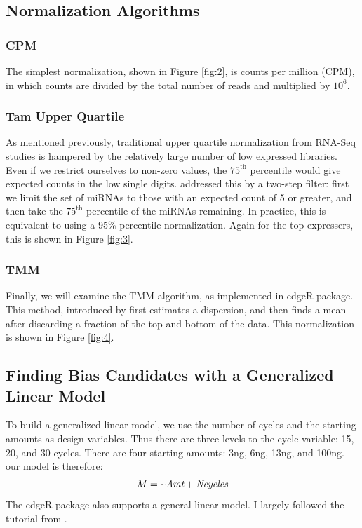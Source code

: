 \documentclass{bioinfo}
\begin{document}
\begin{methods}
\subsection{Normalization Algorithms}
\subsubsection{CPM}
The simplest normalization, shown in Figure \ref{fig:2}, is counts per million (CPM), in which counts are divided by the total number of reads and multiplied by $10^6$. \\

\subsubsection{Tam Upper Quartile}
As mentioned previously, traditional upper quartile normalization from RNA-Seq studies is hampered by the relatively large number of low expressed libraries. Even if we restrict ourselves to non-zero values, the $75^{\text{th}}$ percentile would give expected counts in the low single digits.  \citep{Tam15} addressed this by a two-step filter: first we limit the set of miRNAs to those with an expected count of 5 or greater, and then take the $75^{\text{th}}$ percentile of the miRNAs remaining. In practice, this is equivalent to using a 95\% percentile normalization. Again for the top expressers, this is shown in Figure \ref{fig:3}.
\subsubsection{TMM}
Finally, we will examine the TMM algorithm, as implemented in edgeR \citep{McCarthy12}  package. This method, introduced by \citep{Robinson10} first estimates a dispersion, and then finds a mean after discarding a fraction of the top and bottom of the data. This normalization is shown in Figure \ref{fig:4}.
\subsection{Finding Bias Candidates with a Generalized Linear Model}
To build a generalized linear model, we use the number of cycles and the starting amounts as design variables. Thus there are three levels to the cycle variable: 15, 20, and 30 cycles. There are four starting amounts: 3ng, 6ng, 13ng, and 100ng. 
our model is therefore: \\
\begin{equation}
M = \text{\textasciitilde}\text{\it{Amt}}+\text{\it{Ncycles}}\label{eq:01}
\end{equation}
The edgeR package also supports a general linear model. I largely followed the tutorial from \citep{Rueda15}.
\end{methods}
\end{document}
